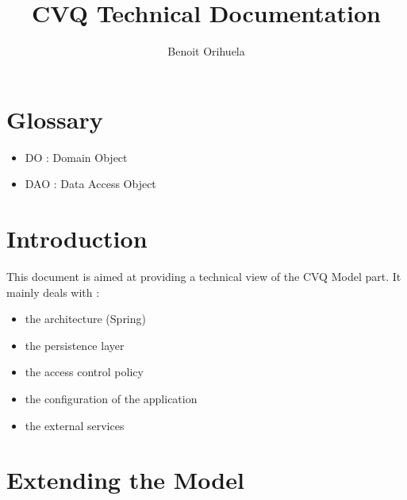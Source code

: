 \documentclass[11pt,a4paper]{report}
\author{Benoit Orihuela}
\title{CVQ Technical Documentation}
\begin{document}
\maketitle
\tableofcontents
\newpage

\chapter{Glossary}
\begin{itemize}
  \item DO : Domain Object
  \item DAO : Data Access Object
\end{itemize}

\chapter{Introduction}
This document is aimed at providing a technical view of the CVQ Model part.
It mainly deals with :
\begin{itemize}
  \item the architecture (Spring)
  \item the persistence layer
  \item the access control policy
  \item the configuration of the application
  \item the external services
\end{itemize}

\chapter{Extending the Model}
\end{document}
